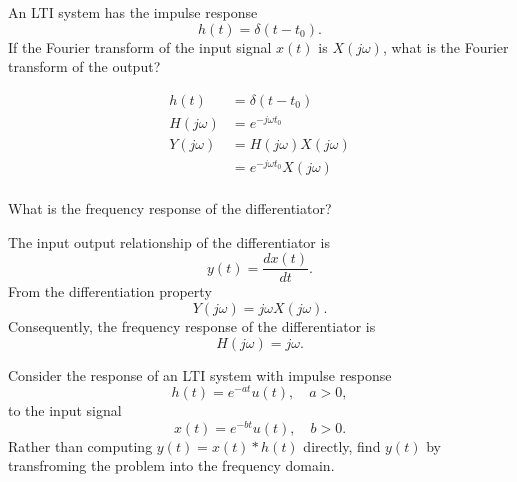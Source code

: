 \begin{frame}[plain]
    \begin{example}
        An LTI system has the impulse response
        \begin{equation*}
            h(t) = \delta(t-t_0).
        \end{equation*}
        If the Fourier transform of the input signal $x(t)$ is $X(j\omega)$, what is the Fourier transform of the output?
    \end{example}
    \pause
    \begin{align*}
      h(t) &= \delta(t-t_0)\\
      H(j\omega) &= e^{-j\omega t_0}\\
      Y(j\omega) &=  H(j\omega)  X(j\omega)\\
      &= e^{-j\omega t_0} X(j\omega)\\
    \end{align*}
\end{frame}

\begin{frame}
    \begin{example}
        What is the frequency response of the differentiator?
    \end{example}
    \pause
    The input output relationship of the differentiator is
    \begin{equation*}
        y(t) = \frac{dx(t)}{dt}.
    \end{equation*}
    From the differentiation property
    \pause
    \begin{equation*}
        Y(j\omega) = j\omega X(j\omega).
    \end{equation*}
    \pause
    Consequently, the frequency response of the differentiator is
    \begin{equation*}
        H(j\omega) = j\omega.
    \end{equation*}
\end{frame}


\begin{frame}
    \begin{example}
        Consider the response of an LTI system with impulse response
        \begin{equation*}
            h(t) = e^{-at}u(t), \quad a>0,
        \end{equation*}
        to the input signal
        \begin{equation*}
            x(t) = e^{-bt}u(t), \quad b>0.
        \end{equation*}
        Rather than computing $y(t) = x(t) \ast h(t)$ directly, find $y(t)$ by transfroming the problem into the frequency domain.
    \end{example}
\end{frame}

